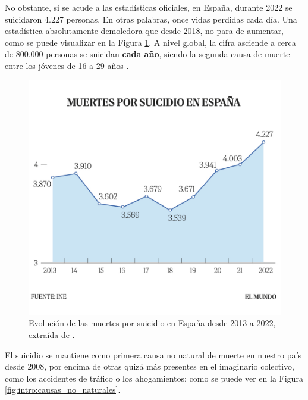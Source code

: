     No obstante, si se acude a las estadísticas oficiales, en España, durante 2022 se suicidaron 4.227 personas. En otras palabras, once vidas perdidas cada día. Una estadística absolutamente demoledora que desde 2018, no para de aumentar, como se puede visualizar en la Figura \ref{fig:intro:muertes_suicidio}. A nivel global, la cifra asciende a cerca de 800.000 personas se suicidan \textbf{cada año}, siendo la segunda causa de muerte entre los jóvenes de 16 a 29 años \cite{confederacion_salud_mental_espana_salud_nodate}.
    
    \begin{figure}[h]
        \centering
        \includegraphics[width=0.6\linewidth]{figures/muertes_suicidio.jpg}
        \caption[Evolución de las muertes por suicidio en España desde 2013 a 2022]{Evolución de las muertes por suicidio en España desde 2013 a 2022, extraída de \cite{saiz_4227_2023}.}
        \label{fig:intro:muertes_suicidio}
    \end{figure}

    El suicidio se mantiene como primera causa no natural de muerte en nuestro país desde 2008, por encima de otras quizá más presentes en el imaginario colectivo, como los accidentes de tráfico o los ahogamientos; como se puede ver en la Figura \ref{fig:intro:causas_no_naturales}.
    

